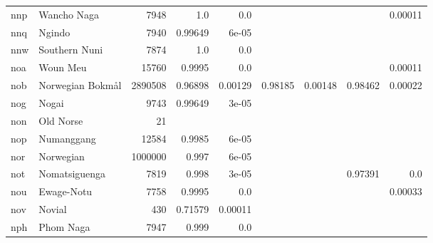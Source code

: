 \documentclass[11pt]{article}
\begin{document}
\begin{table*}[h]
{\begin{tabular}{llrrrrrrr}
nnp         & Wancho Naga         & 7948         & 1.0         & 0.0         &          &          &          & 0.00011         \\

nnq         & Ngindo         & 7940         & 0.99649         & 6e-05         &          &          &          &          \\

nnw         & Southern Nuni         & 7874         & 1.0         & 0.0         &          &          &          &          \\

noa         & Woun Meu         & 15760         & 0.9995         & 0.0         &          &          &          & 0.00011         \\

nob         & Norwegian Bokmål         & 2890508         & 0.96898         & 0.00129         & 0.98185         & 0.00148         & 0.98462         & 0.00022         \\

nog         & Nogai         & 9743         & 0.99649         & 3e-05         &          &          &          &          \\

non         & Old Norse         & 21         &          &          &          &          &          &          \\

nop         & Numanggang         & 12584         & 0.9985         & 6e-05         &          &          &          &          \\

nor         & Norwegian         & 1000000         & 0.997         & 6e-05         &          &          &          &          \\

not         & Nomatsiguenga         & 7819         & 0.998         & 3e-05         &          &          & 0.97391         & 0.0         \\

nou         & Ewage-Notu         & 7758         & 0.9995         & 0.0         &          &          &          & 0.00033         \\

nov         & Novial         & 430         & 0.71579         & 0.00011         &          &          &          &          \\

nph         & Phom Naga         & 7947         & 0.999         & 0.0         &          &          &          &          \\


\end{tabular}}
\end{table*}
\end{document}
